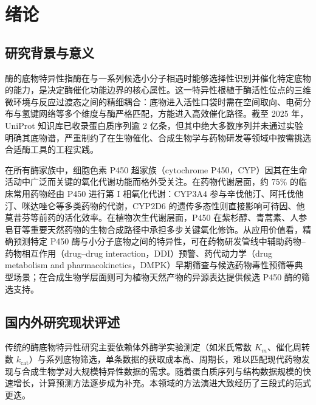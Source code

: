 
\chapter{绪论}
\label{cha:introduction}

\section{研究背景与意义}
\label{sec:background}

酶的底物特异性指酶在与一系列候选小分子相遇时能够选择性识别并催化特定底物的能力，是决定酶催化功能边界的核心属性\cite{Bak2011,Guengerich2008}。这一特异性根植于酶活性位点的三维微环境与反应过渡态之间的精细耦合：底物进入活性口袋时需在空间取向、电荷分布与氢键网络等多个维度与酶严格匹配，方能进入高效催化路径。截至 2025 年，UniProt 知识库已收录蛋白质序列逾 2 亿条\cite{UniProt2025}，但其中绝大多数序列并未通过实验明确其底物谱，严重制约了在生物催化、合成生物学与药物研发等领域中按需挑选合适酶工具的工程实践。

在所有酶家族中，细胞色素 P450 超家族（cytochrome P450，CYP）因其在生命活动中广泛而关键的氧化代谢功能而格外受关注\cite{Guengerich2008,Nelson2009,Wienkers2005}。在药物代谢层面，约 75\% 的临床常用药物经由 P450 进行第 I 相氧化代谢\cite{Zanger2013}：CYP3A4 参与辛伐他汀、阿托伐他汀、咪达唑仑等多类药物的代谢，CYP2D6 的遗传多态性则直接影响可待因、他莫昔芬等前药的活化效率。在植物次生代谢层面，P450 在紫杉醇、青蒿素、人参皂苷等重要天然药物的生物合成路径中承担多步关键氧化修饰\cite{Bak2011,Nelson2004,Ma2020}。从应用价值看，精确预测特定 P450 酶与小分子底物之间的特异性，可在药物研发管线中辅助药物--药物相互作用（drug--drug interaction，DDI）预警、药代动力学（drug metabolism and pharmacokinetics，DMPK）早期筛查与候选药物毒性预筛等典型场景\cite{vandeWaterbeemd2003}；在合成生物学层面则可为植物天然产物的异源表达提供候选 P450 酶的筛选支持。

\section{国内外研究现状评述}
\label{sec:related_work}

传统的酶底物特异性研究主要依赖体外酶学实验测定（如米氏常数 $K_m$、催化周转数 $k_{\mathrm{cat}}$）与系列底物筛选\cite{CornishBowden2012}，单条数据的获取成本高、周期长，难以匹配现代药物发现与合成生物学对大规模特异性数据的需求。随着蛋白质序列与结构数据规模的快速增长，计算预测方法逐步成为补充。本领域的方法演进大致经历了三段式的范式更迭。

